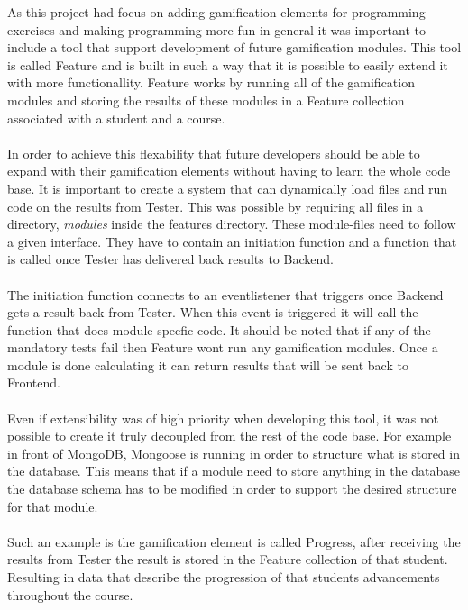 As this project had focus on adding gamification elements for programming exercises
and making programming more fun in general it was important to include
a tool that support development of future gamification modules. This tool is called
Feature and is built in such a way that it is possible to easily extend it with more
functionallity. Feature works by running all of the gamification modules and
storing the results of these modules in a Feature collection associated with
a student and a course.\\
\\
In order to achieve this flexability that future developers should be able to expand
with their gamification elements without having to learn the whole code base.
It is important to create a system that can dynamically load files and run
code on the results from Tester. This was possible by requiring all
files in a directory, \textit{modules} inside the features directory. These module-files need to follow
a given interface. They have to contain an initiation function and a function
that is called once Tester has delivered back results to Backend. \\
\\
The initiation function connects to an eventlistener that triggers once Backend
gets a result back from Tester. When this event is triggered it will call the
function that does module specfic code. It should be noted that if any of the
mandatory tests fail then Feature wont run any gamification modules. Once a module
is done calculating it can return results that will be sent back to Frontend.\\
\\
Even if extensibility was of high priority when developing this tool, it was not
possible to create it truly decoupled from the rest of the code base. For example
in front of MongoDB, Mongoose is running in order to structure what is stored in
the database. This means that if a module need to store anything in the database
the database schema has to be modified in order to support the desired structure
for that module.\\
\\
Such an example is the gamification element is called Progress, after
receiving the results from Tester the result is stored in the Feature collection
of that student. Resulting in data that describe the progression of that students
advancements throughout the course. %
